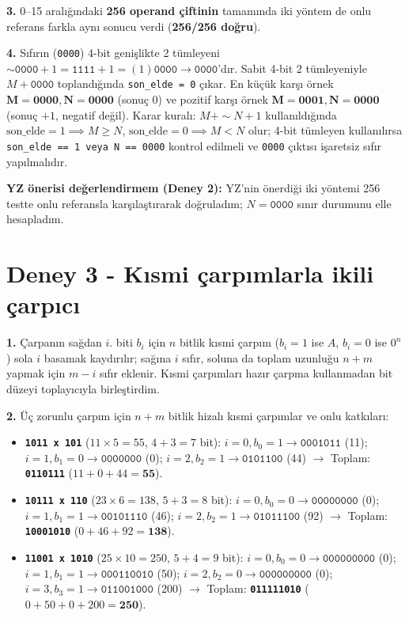 \documentclass[10pt,a4paper]{article}
\begin{document}
\textbf{3.} 0--15 aralığındaki \textbf{256 operand çiftinin} tamamında iki yöntem de onlu referans farkla aynı sonucu verdi (\textbf{256/256 doğru}).

\textbf{4.} Sıfırın (\texttt{0000}) 4-bit genişlikte 2 tümleyeni $\sim\texttt{0000} + 1 = \texttt{1111} + 1 = (1)\texttt{0000} \rightarrow \texttt{0000}$'dır. Sabit 4-bit 2 tümleyeniyle $M + \texttt{0000}$ toplandığında \texttt{son\_elde = 0} çıkar. En küçük karşı örnek $\mathbf{M = 0000, N = 0000}$ (sonuç 0) ve pozitif karşı örnek $\mathbf{M = 0001, N = 0000}$ (sonuç $+1$, negatif değil). Karar kuralı: $M + \sim N + 1$ kullanıldığında $\text{son\_elde}=1 \implies M \ge N$, $\text{son\_elde}=0 \implies M < N$ olur; 4-bit tümleyen kullanılırsa \texttt{son\_elde == 1 veya N == 0000} kontrol edilmeli ve \texttt{0000} çıktısı işaretsiz sıfır yapılmalıdır.

\textbf{YZ önerisi değerlendirmem (Deney 2):} YZ'nin önerdiği iki yöntemi 256 testte onlu referansla karşılaştırarak doğruladım; $N=\texttt{0000}$ sınır durumunu elle hesapladım.

\section*{Deney 3 - Kısmi çarpımlarla ikili çarpıcı}

\textbf{1.} Çarpanın sağdan $i$. biti $b_i$ için $n$ bitlik kısmi çarpım ($b_i=1$ ise $A$, $b_i=0$ ise $0^n$) sola $i$ basamak kaydırılır; sağına $i$ sıfır, soluna da toplam uzunluğu $n+m$ yapmak için $m-i$ sıfır eklenir. Kısmi çarpımları hazır çarpma kullanmadan bit düzeyi toplayıcıyla birleştirdim.

\textbf{2.} Üç zorunlu çarpım için $n+m$ bitlik hizalı kısmi çarpımlar ve onlu katkıları:
\begin{itemize}
    \item \textbf{\texttt{1011 x 101}} ($11 \times 5 = 55$, $4+3=7$ bit): $i=0, b_0=1 \rightarrow \texttt{0001011}$ (11); $i=1, b_1=0 \rightarrow \texttt{0000000}$ (0); $i=2, b_2=1 \rightarrow \texttt{0101100}$ (44) $\rightarrow$ Toplam: \textbf{\texttt{0110111}} ($11 + 0 + 44 = \mathbf{55}$).
    \item \textbf{\texttt{10111 x 110}} ($23 \times 6 = 138$, $5+3=8$ bit): $i=0, b_0=0 \rightarrow \texttt{00000000}$ (0); $i=1, b_1=1 \rightarrow \texttt{00101110}$ (46); $i=2, b_2=1 \rightarrow \texttt{01011100}$ (92) $\rightarrow$ Toplam: \textbf{\texttt{10001010}} ($0 + 46 + 92 = \mathbf{138}$).
    \item \textbf{\texttt{11001 x 1010}} ($25 \times 10 = 250$, $5+4=9$ bit): $i=0, b_0=0 \rightarrow \texttt{000000000}$ (0); $i=1, b_1=1 \rightarrow \texttt{000110010}$ (50); $i=2, b_2=0 \rightarrow \texttt{000000000}$ (0); $i=3, b_3=1 \rightarrow \texttt{011001000}$ (200) $\rightarrow$ Toplam: \textbf{\texttt{011111010}} ($0 + 50 + 0 + 200 = \mathbf{250}$).
\end{itemize}
\end{document}
